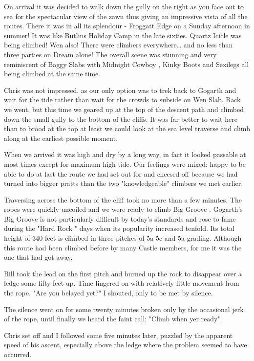\documentclass[a5paper,openany,font 10pt]{scrbook}
\begin{document}
On arrival it was decided to walk down the gully on the
right as you face out to sea for the spectacular view of the zawn
thus giving an impressive vista of all the routes. There it was
in all its splendour - Froggatt Edge on a Sunday afternoon in
summer! It was like Butlins Holiday Camp in the late sixties.
Quartz Icicle  was being climbed!  Wen  also! There were climbers
everywhere\ldots{} and no less than three parties on  Dream  alone! The
overall scene was stunning and very reminiscent of Baggy Slabs
with  Midnight Cowboy ,  Kinky Boots  and  Sexilegs   all being climbed
at the same time.

Chris was not impressed, as our only option was to trek back
to Gogarth and wait for the tide rather than wait for the crowds
to subside on Wen Slab.  Back we went, but this time we geared up
at the top of the descent path and climbed down the small gully
to the bottom of the cliffs. It was far better to wait here than
to brood at the top  at least we could look at the sea level
traverse and climb along at the earliest possible moment.

When we arrived it was high and dry by a long way, in fact
it looked passable at most times except for maximum high tide.
Our feelings were mixed: happy to be able to do at last the route
we had set out for and cheesed off because we had turned into
bigger pratts than the two "knowledgeable" climbers we met
earlier.

Traversing across the bottom of the cliff took no more than
a few minutes. The ropes were quickly uncoiled and we were ready
to climb  Big Groove .  Gogarth's  Big Groove  is not particularly
difficult by today's standards and rose to fame during the "Hard
Rock " days when its popularity increased tenfold.  Its total
height of 340 feet is climbed in three pitches of 5a 5c  and 5a
grading. Although this route had been climbed before by many
Castle members, for me it was the one that had got away.

Bill took the lead on the first pitch and burned up the rock
to disappear over a ledge some fifty feet up. Time lingered on
with relatively little movement from the rope.
	"Are you belayed yet?" I shouted, only to be met by silence.

The silence went on for some twenty minutes broken only by
the occasional jerk of the rope, until finally we heard the faint
call:
	"Climb when yer ready".

Chris set off and I followed some five minutes later,
puzzled by the apparent speed of his ascent, especially above the
ledge where the problem seemed to have occurred.
\end{document}
